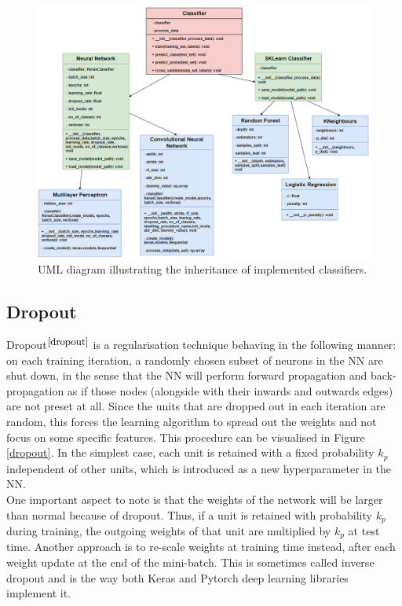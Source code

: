 \begin{figure}[H]
  \centering
  \centerline{\includegraphics[scale = 0.6]{Images/uml.png}}
  \caption{UML diagram illustrating the inheritance of implemented classifiers.}
  \label{uml_oop}
\end{figure}

\subsection{Dropout}

Dropout$^{\small \cite{dropout}}$ is a regularisation technique behaving in the following manner: on each training iteration, a randomly chosen subset of neurons in the NN are shut down, in the sense that the NN will perform forward propagation and back-propagation as if those nodes (alongside with their inwards and outwards edges) are not preset at all. Since the units that are dropped out in each iteration are random, this forces the learning algorithm to spread out the weights and not focus on some specific features. This procedure can be visualised in Figure \ref{dropout}. In the simplest case, each unit is retained with a fixed probability $k_p$ independent of other units, which is introduced as a new hyperparameter in the NN. \\

One important aspect to note is that the weights of the network will be larger than normal because of dropout. Thus, if a unit is retained with probability $k_p$ during training, the outgoing weights of that unit are multiplied by $k_p$ at test
time. Another approach is to re-scale weights at training time instead, after each weight update at the end of the mini-batch. This is sometimes called inverse dropout and is the way both Keras and Pytorch deep learning libraries implement it. \\


